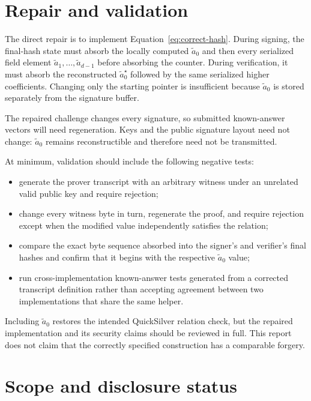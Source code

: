 \documentclass[11pt,a4paper]{article}
\begin{document}
\section{Repair and validation}

The direct repair is to implement Equation~\eqref{eq:correct-hash}.  During
signing, the final-hash state must absorb the locally computed
$\widetilde a_0$ and then every serialized field element
$\widetilde a_1,\ldots,\widetilde a_{d-1}$ before absorbing the counter.
During verification, it must absorb the reconstructed
$\widetilde a_0^{\star}$ followed by the same serialized higher coefficients.
Changing only the starting pointer is insufficient because
$\widetilde a_0$ is stored separately from the signature buffer.

The repaired challenge changes every signature, so submitted known-answer
vectors will need regeneration.  Keys and the public signature layout need
not change: $\widetilde a_0$ remains reconstructible and therefore need not be
transmitted.

At minimum, validation should include the following negative tests:
\begin{itemize}[leftmargin=1.5em]
  \item generate the prover transcript with an arbitrary witness under an
        unrelated valid public key and require rejection;
  \item change every witness byte in turn, regenerate the proof, and require
        rejection except when the modified value independently satisfies the
        relation;
  \item compare the exact byte sequence absorbed into the signer's and
        verifier's final hashes and confirm that it begins with the respective
        $\widetilde a_0$ value;
  \item run cross-implementation known-answer tests generated from a corrected
        transcript definition rather than accepting agreement between two
        implementations that share the same helper.
\end{itemize}

Including $\widetilde a_0$ restores the intended QuickSilver relation check,
but the repaired implementation and its security claims should be reviewed in
full.  This report does not claim that the correctly specified construction
has a comparable forgery.

\section{Scope and disclosure status}
\end{document}
